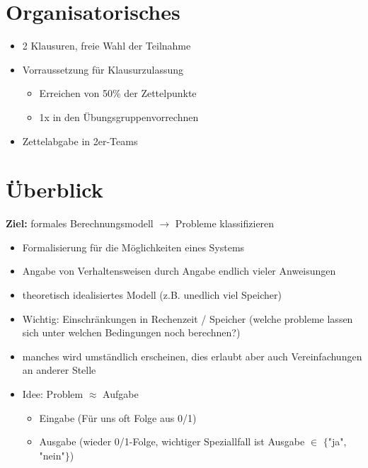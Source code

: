 
\section*{Organisatorisches}

\begin{itemize}
    \item 2 Klausuren, freie Wahl der Teilnahme
    \item Vorraussetzung für Klausurzulassung
    \begin{itemize}
        \item Erreichen von 50\% der Zettelpunkte
        \item 1x in den Übungsgruppenvorrechnen
    \end{itemize}
    \item Zettelabgabe in 2er-Teams
\end{itemize}

\section{Überblick}

\textbf{Ziel:} formales Berechnungsmodell $\rightarrow$ Probleme klassifizieren
\begin{itemize}
    \item Formalisierung für die Möglichkeiten eines Systems
    \item Angabe von Verhaltensweisen durch Angabe endlich vieler Anweisungen
    \item theoretisch idealisiertes Modell (z.B. unedlich viel Speicher)
    \item Wichtig: Einschränkungen in Rechenzeit / Speicher (welche probleme lassen sich unter welchen Bedingungen noch berechnen?)
    \item manches wird umständlich erscheinen, dies erlaubt aber auch Vereinfachungen an anderer Stelle
    \item Idee: Problem $\approx$ Aufgabe
    \begin{itemize}
        \item Eingabe (Für uns oft Folge aus 0/1)
        \item Ausgabe (wieder 0/1-Folge, wichtiger Speziallfall ist Ausgabe $\in$ $\{$"ja", "nein"$\}$)
    \end{itemize}
\end{itemize}

\pagebreak

